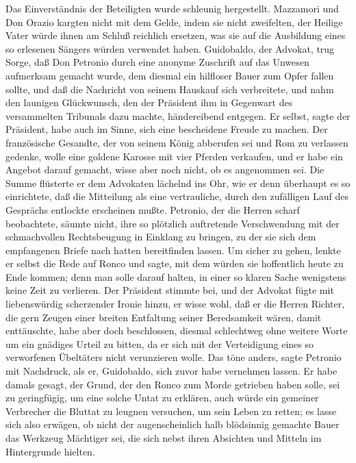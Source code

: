 Das Einverständnis der Beteiligten wurde schleunig hergestellt.
Mazzamori und Don Orazio kargten nicht mit dem\pagenum{[75]}
Gelde, indem sie nicht zweifelten, der Heilige Vater würde ihnen am
Schluß reichlich ersetzen, was sie auf die Ausbildung eines so
erlesenen Sängers würden verwendet haben. Guidobaldo, der Advokat,
trug Sorge, daß Don Petronio durch eine anonyme Zuschrift auf das
Unwesen aufmerksam gemacht wurde, dem diesmal ein hilfloser Bauer
zum Opfer fallen sollte, und daß die Nachricht von seinem Hauskauf
sich verbreitete, und nahm den launigen Glückwunsch, den der
Präsident ihm in Gegenwart des versammelten Tribunals dazu machte,
händereibend entgegen. Er selbst, sagte der Präsident, habe auch im
Sinne, sich eine bescheidene Freude zu machen. Der französische
Gesandte, der von seinem König abberufen sei und Rom zu verlassen
gedenke, wolle eine goldene Karosse mit vier Pferden verkaufen, und
er habe ein Angebot darauf gemacht, wisse aber noch nicht, ob es
angenommen sei. Die Summe flüsterte er dem Advokaten lächelnd ins
Ohr, wie er denn überhaupt es so einrichtete, daß die Mitteilung
als eine vertrauliche, durch den zufälligen Lauf des Gesprächs
entlockte erscheinen mußte. Petronio, der die Herren scharf
beobachtete, säumte nicht, ihre so plötzlich auftretende
Verschwendung mit der schmachvollen Rechtsbeugung in Einklang zu
bringen, zu der sie sich dem empfangenen Briefe nach hatten
bereitfinden lassen. Um sicher zu gehen, lenkte er selbst die Rede
auf Ronco und sagte, mit dem würden sie hoffentlich heute zu Ende
kommen; denn man solle darauf halten, in einer so klaren Sache
wenigstens keine Zeit zu verlieren. Der Präsident stimmte bei, und
der Advokat fügte mit liebenswürdig scherzender Ironie hinzu, er
wisse wohl, daß er die Herren Richter, die gern Zeugen einer
breiten Entfaltung seiner Beredsamkeit wären, damit enttäuschte,
habe aber doch beschlossen,\pagenum{[76]} diesmal schlechtweg ohne
weitere Worte um ein gnädiges Urteil zu bitten, da er sich mit der
Verteidigung eines so verworfenen Übeltäters nicht verunzieren
wolle. Das töne anders, sagte Petronio mit Nachdruck, als er,
Guidobaldo, sich zuvor habe vernehmen lassen. Er habe damals
gesagt, der Grund, der den Ronco zum Morde getrieben haben solle,
sei zu geringfügig, um eine solche Untat zu erklären, auch würde
ein gemeiner Verbrecher die Bluttat zu leugnen versuchen, um sein
Leben zu retten; es lasse sich also erwägen, ob nicht der
augenscheinlich halb blödsinnig gemachte Bauer das Werkzeug
Mächtiger sei, die sich nebst ihren Absichten und Mitteln im
Hintergrunde hielten.

